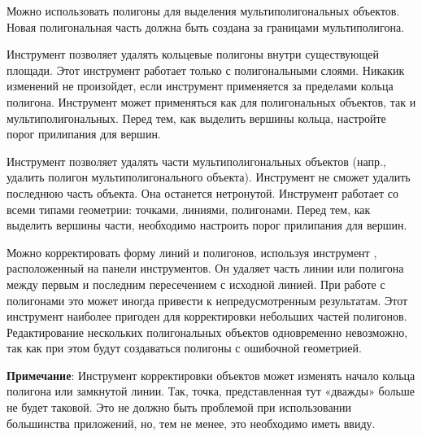 
Можно использовать  полигоны
для выделения мультиполигональных объектов. Новая полигональная часть
должна быть создана за границами мультиполигона.



Инструмент  позволяет удалять
кольцевые полигоны внутри существующей площади. Этот инструмент работает
только с полигональными слоями. Никакик изменений не произойдет, если
инструмент применяется за пределами кольца полигона. Инструмент может
применяться как для полигональных объектов, так и мультиполигональных.
Перед тем, как выделить вершины кольца, настройте порог прилипания для вершин.



Инструмент  позволяет удалять
части мультиполигональных объектов (напр., удалить полигон
мультиполигонального объекта). Инструмент не сможет удалить последнюю часть
объекта. Она останется нетронутой. Инструмент работает со всеми типами
геометрии: точками, линиями, полигонами. Перед тем, как выделить вершины
части, необходимо настроить порог прилипания для вершин.


Можно корректировать форму линий и полигонов, используя инструмент
, расположенный на
панели инструментов. Он удаляет часть линии или полигона между первым и
последним пересечением с исходной линией. При работе с полигонами это
может иногда привести к непредусмотренным результатам. Этот инструмент
наиболее пригоден для корректировки небольших частей полигонов. Редактирование
нескольких  полигональных объектов одновременно невозможно, так как при этом
будут создаваться полигоны с ошибочной геометрией.

\textbf{Примечание}: Инструмент корректировки объектов может изменять начало
кольца полигона или замкнутой линии. Так, точка, представленная тут «дважды»
больше не будет таковой. Это не должно быть проблемой при использовании
большинства приложений, но, тем не менее, это необходимо иметь ввиду.


